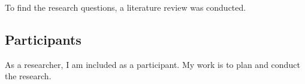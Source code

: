 
To find the research questions, a literature review was conducted. 


\subsection*{Participants}




As a researcher, I am included as a participant. My work is to plan and conduct the research.


